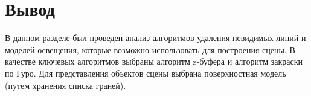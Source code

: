 \section{Вывод}
В данном разделе был проведен анализ алгоритмов удаления невидимых линий и моделей освещения, которые возможно использовать для построения сцены. В качестве ключевых алгоритмов выбраны алгоритм z-буфера и алгоритм закраски по Гуро. Для представления объектов сцены выбрана поверхностная модель (путем хранения списка граней).

